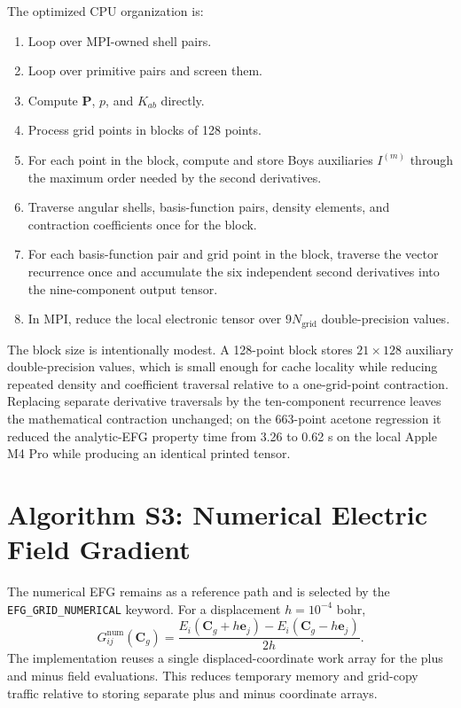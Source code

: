 \documentclass[journal=jcisd8,manuscript=suppinfo]{achemso}
\begin{document}
The optimized CPU organization is:
\begin{enumerate}
  \item Loop over MPI-owned shell pairs.
  \item Loop over primitive pairs and screen them.
  \item Compute \(\mathbf{P}\), \(p\), and \(K_{ab}\) directly.
  \item Process grid points in blocks of 128 points.
  \item For each point in the block, compute and store Boys auxiliaries \(I^{(m)}\) through the maximum order needed by the second derivatives.
  \item Traverse angular shells, basis-function pairs, density elements, and contraction coefficients once for the block.
  \item For each basis-function pair and grid point in the block, traverse the vector recurrence once and accumulate the six independent second derivatives into the nine-component output tensor.
  \item In MPI, reduce the local electronic tensor over \(9N_{\mathrm{grid}}\) double-precision values.
\end{enumerate}

The block size is intentionally modest.  A 128-point block stores \(21\times128\) auxiliary double-precision values, which is small enough for cache locality while reducing repeated density and coefficient traversal relative to a one-grid-point contraction.  Replacing separate derivative traversals by the ten-component recurrence leaves the mathematical contraction unchanged; on the 663-point acetone regression it reduced the analytic-EFG property time from 3.26 to 0.62 s on the local Apple M4 Pro while producing an identical printed tensor.

\section{Algorithm S3: Numerical Electric Field Gradient}

The numerical EFG remains as a reference path and is selected by the \texttt{EFG\_GRID\_NUMERICAL} keyword.  For a displacement \(h=10^{-4}\) bohr,
\begin{equation}
  G_{ij}^{\mathrm{num}}(\mathbf{C}_g)
  =
  \frac{
    E_i(\mathbf{C}_g+h\mathbf{e}_j)
    -
    E_i(\mathbf{C}_g-h\mathbf{e}_j)
  }{2h}.
\end{equation}
The implementation reuses a single displaced-coordinate work array for the plus and minus field evaluations.  This reduces temporary memory and grid-copy traffic relative to storing separate plus and minus coordinate arrays.
\end{document}
